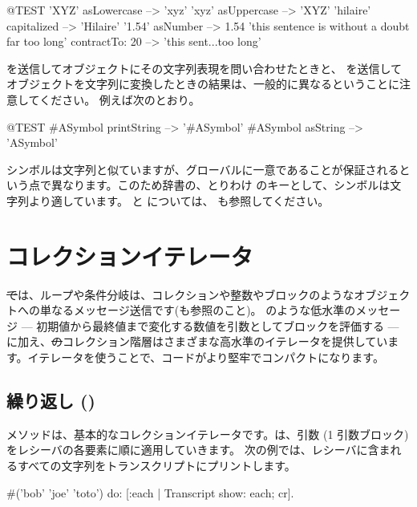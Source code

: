 \documentclass[a4paper,10pt,twoside]{book}
\begin{document}
\begin{code}{@TEST}
'XYZ' asLowercase --> 'xyz'
'xyz' asUppercase   --> 'XYZ'
'hilaire' capitalized   --> 'Hilaire'
'1.54' asNumber      --> 1.54
'this sentence is without a doubt far too long' contractTo: 20 --> 'this sent...too long'
\end{code}

 を送信してオブジェクトにその文字列表現を問い合わせたときと、 を送信してオブジェクトを文字列に変換したときの結果は、一般的に異なるということに注意してください。
例えば次のとおり。

\begin{code}{@TEST}
#ASymbol printString --> '#ASymbol'
#ASymbol asString    --> 'ASymbol'
\end{code}

シンボルは文字列と似ていますが、グローバルに一意であることが保証されるという点で異なります。このため辞書の、とりわけ  のキーとして、シンボルは文字列より適しています。
 と  については、 も参照してください。

\section{コレクションイテレータ}

\st では、ループや条件分岐は、コレクションや整数やブロックのようなオブジェクトへの単なるメッセージ送信です(も参照のこと)。 のような低水準のメッセージ --- 初期値から最終値まで変化する数値を引数としてブロックを評価する --- に加え、\st のコレクション階層はさまざまな高水準のイテレータを提供しています。イテレータを使うことで、コードがより堅牢でコンパクトになります。

\subsection{繰り返し ()}
 メソッドは、基本的なコレクションイテレータです。は、引数 (1 引数ブロック)をレシーバの各要素に順に適用していきます。
次の例では、レシーバに含まれるすべての文字列をトランスクリプトにプリントします。

\begin{code}{}
#('bob' 'joe' 'toto') do: [:each | Transcript show: each; cr].
\end{code}
\end{document}
